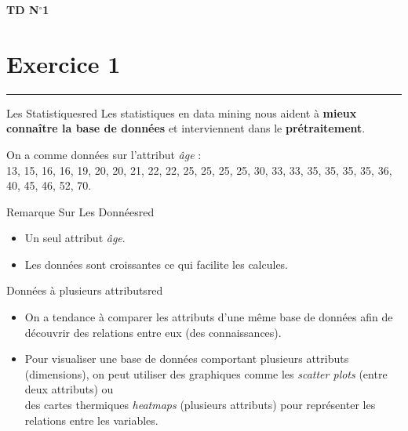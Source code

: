 \documentclass{article}
\newcommand{\exer}[1]{
  \section*{Exercice #1}
  \vspace{-0.5cm}
  \noindent\rule{\textwidth}{0.5pt}%
}
\newcommand{\tit}[1]{
\begin{center}
    \Large{\textbf{{#1}}}
\end{center}
}
\begin{document}
\tit{TD N\(^{\boldsymbol{\circ}}\)\hspace{0.1cm}1}
\exer{1}

\vspace{0.25cm}

\begin{prettyBox}{Les Statistiques}{red}
Les statistiques en data mining nous aident à \textbf{mieux connaître la base de données} et interviennent dans le \textbf{prétraitement}.
\end{prettyBox}

\vspace{0.25cm}
On a comme données sur l’attribut \textit{âge} :\\[0.1cm]
13, 15, 16, 16, 19, 20, 20, 21, 22, 22, 25, 25, 25, 25, 30, 33, 33, 35, 35, 35, 35, 36, 40, 45, 46, 52, 70.


\begin{prettyBox}{Remarque Sur Les Données}{red}
\begin{itemize}
    \item Un seul attribut \textit{âge}.
    \item Les données sont croissantes ce qui facilite les calcules. 
\end{itemize}
\end{prettyBox}

\vspace{0.25cm}


\begin{prettyBox}{Données à plusieurs attributs}{red}
    \begin{itemize}
        \item On a tendance à comparer les attributs d’une même base de données afin de découvrir des relations entre eux (des connaissances).
        \item Pour visualiser une base de données comportant plusieurs attributs (dimensions), on peut utiliser des graphiques comme les \textit{scatter plots} (entre deux attributs) ou \\des cartes thermiques \textit{heatmaps} (plusieurs attributs) pour représenter les relations entre les variables.
    \end{itemize}
\end{prettyBox}

\vspace{0.15cm}
\end{document}
